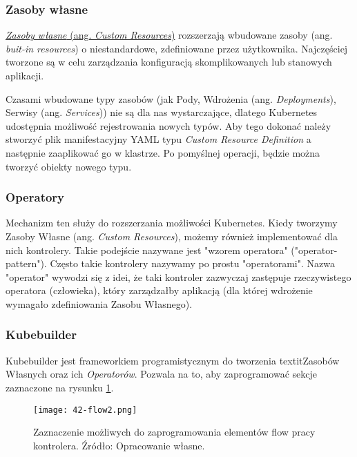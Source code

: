\subsubsection{Zasoby własne} 

\hyperlink{def:zasoby-wlasne}{\textit{Zasoby własne} (ang. \textit{Custom Resources})} rozszerzają wbudowane zasoby (ang. \textit{buit-in resources}) o niestandardowe, zdefiniowane przez użytkownika. Najczęściej tworzone są w celu zarządzania konfiguracją skomplikowanych lub stanowych aplikacji. 

Czasami wbudowane typy zasobów (jak Pody, Wdrożenia (ang. \textit{Deployments}), Serwisy (ang. \textit{Services})) nie są dla nas wystarczające, dlatego Kubernetes udostępnia możliwość rejestrowania nowych typów. Aby tego dokonać należy stworzyć plik manifestacyjny YAML typu \textit{Custom Resource Definition} a następnie zaaplikować go w klastrze. Po pomyślnej operacji, będzie można tworzyć obiekty nowego typu.

\subsubsection{Operatory}

Mechanizm ten służy do rozszerzania możliwości Kubernetes. Kiedy tworzymy Zasoby Własne (ang. \textit{Custom Resources}), możemy również implementować dla nich kontrolery. Takie podejście nazywane jest "wzorem operatora" ("operator-pattern"). Często takie kontrolery nazywamy po prostu "operatorami". Nazwa "operator" wywodzi się z idei, że taki kontroler zazwyczaj zastępuje rzeczywistego operatora (człowieka), który zarządzałby aplikacją (dla której wdrożenie wymagało zdefiniowania Zasobu Własnego).

\subsubsection{Kubebuilder}

Kubebuilder jest frameworkiem programistycznym do tworzenia textit{Zasobów Własnych} oraz ich \textit{Operatorów}. Pozwala na to, aby zaprogramować sekcje zaznaczone na rysunku \ref{fig:42-flow2}.


\begin{figure}[!h]
    \centering \texttt{[image: 42-flow2.png]}
    \caption{Zaznaczenie możliwych do zaprogramowania elementów flow pracy kontrolera. Źródło: Opracowanie własne.}\label{fig:42-flow2}
\end{figure}
